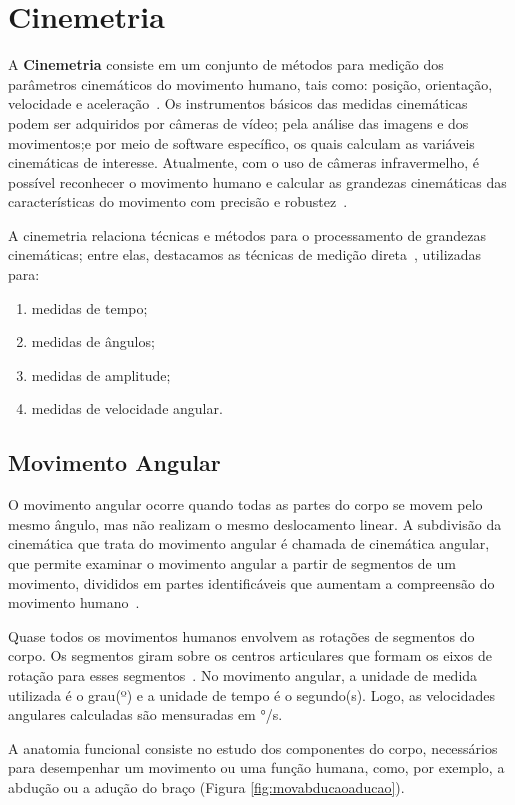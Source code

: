 \section{Cinemetria}
A \textbf{Cinemetria} consiste em um conjunto de métodos para medição dos parâmetros cinemáticos do movimento humano, tais como: posição, orientação, velocidade e aceleração~\cite{biomecanica99}. Os instrumentos básicos das medidas cinemáticas podem ser adquiridos por câmeras de vídeo; pela análise das imagens e dos movimentos;e  por meio de software específico, os quais calculam as variáveis cinemáticas de interesse. Atualmente, com o uso de câmeras infravermelho, é possível reconhecer o movimento humano e calcular as grandezas cinemáticas das características do movimento com precisão e robustez~\cite{gabel2012}.

A cinemetria relaciona técnicas e métodos para o processamento de grandezas cinemáticas; entre elas, destacamos as técnicas de medição direta~\cite{biomecanica99}, utilizadas para: 
\begin{enumerate}
	\item medidas de tempo;
	\item medidas de ângulos;
	\item medidas de amplitude;
	\item medidas de velocidade angular.
\end{enumerate}

\subsection{Movimento Angular}
O movimento angular ocorre quando todas as partes do corpo se movem pelo mesmo ângulo, mas não realizam o mesmo deslocamento linear. A subdivisão da cinemática que trata do movimento angular é chamada de cinemática angular, que permite examinar o movimento angular a partir de segmentos de um movimento, divididos em partes identificáveis que aumentam a compreensão do movimento humano~\cite{hamill1999bases}. 

Quase todos os movimentos humanos envolvem as rotações de segmentos do corpo. Os segmentos giram sobre os centros articulares que formam os eixos de rotação para esses segmentos~\cite{hamill1999bases}. No movimento angular, a unidade de medida utilizada é o grau(º) e a unidade de tempo é o segundo(s). Logo, as velocidades angulares calculadas são mensuradas em °/s.

A anatomia funcional consiste no estudo dos componentes do corpo, necessários para desempenhar um movimento ou uma função humana, como, por exemplo, a abdução ou a adução do braço (Figura \ref{fig:movabducaoaducao}).

